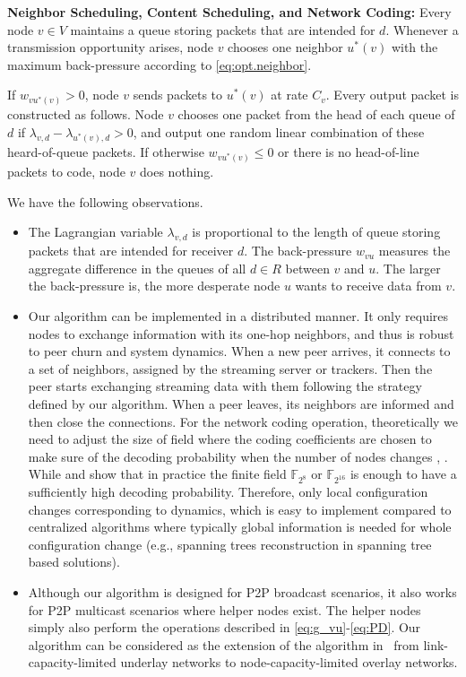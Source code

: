 \documentclass[10pt,conference]{IEEEtran}
\begin{document}
\textbf{Neighbor Scheduling, Content Scheduling, and Network Coding:}
Every node $v\in V$ maintains a queue storing packets that are intended
for $d$. Whenever a transmission opportunity arises, node $v$ chooses
one neighbor $u^{*}(v)$ with the maximum back-pressure according to \eqref{eq:opt.neighbor}.

If $w_{vu^{*}(v)}>0$, node $v$ sends packets to $u^{*}(v)$ at rate
$C_{v}$. Every output packet is constructed as follows. Node $v$
chooses one packet from the head of each queue of $d$ if $\lambda_{v,d}-\lambda_{u^{*}(v),d}>0$,
and output one random linear combination of these heard-of-queue packets.
If otherwise $w_{vu^{*}(v)}\leq0$ or there is no head-of-line packets
to code, node $v$ does nothing.

We have the following observations.
\begin{itemize}
\item The Lagrangian variable $\lambda_{v,d}$ is proportional to the length
of queue storing packets that are intended for receiver $d$. The
back-pressure $w_{vu}$ measures the aggregate difference in the queues
of all $d\in R$ between $v$ and $u$. The larger the back-pressure is, the
more desperate node $u$ wants to receive data from $v$.
\item Our algorithm can be implemented in a distributed manner. It only
requires nodes to exchange information with its one-hop neighbors,
and thus is robust to peer churn and system dynamics. When a new peer arrives,
it connects to a set of neighbors, assigned by the streaming server or trackers. Then the peer starts exchanging streaming data with them following the strategy defined by our algorithm. When a peer leaves, its neighbors are informed and then close the connections. For the network coding operation, theoretically we need to adjust the size of field where the coding coefficients are chosen to make sure of the decoding probability when the number of nodes changes \cite{all:article:HMKKESL04}, \cite{all:RandomNC:SET03}. While \cite{chou2003practical} and \cite{wang2007r} show that in practice the finite field $\mathbb{F}_{2^8}$ or $\mathbb{F}_{2^{16}}$ is enough to have a sufficiently high decoding probability. Therefore, only local
configuration changes corresponding to dynamics, which is easy to implement
compared to centralized algorithms where typically global information is needed for whole configuration change (e.g., spanning trees reconstruction in spanning tree based solutions).
\item Although our algorithm is designed for P2P broadcast scenarios, it
also works for P2P multicast scenarios where helper nodes exist. The
helper nodes simply also perform the operations described in
\eqref{eq:g_vu}-\eqref{eq:PD}. Our algorithm can be considered as
the extension of the algorithm in~\cite{ho2009dynamic} from
link-capacity-limited underlay networks to node-capacity-limited
overlay networks.
\end{itemize}
\end{document}
